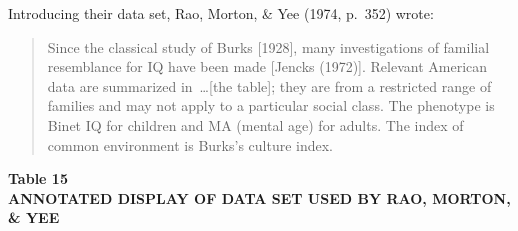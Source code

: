 ﻿\documentclass[12pt]{article}
\begin{document}
Introducing their data set, Rao, Morton, \& Yee (1974, p.\ 352) wrote:

\begin{quote}
Since the classical study of Burks [1928], many investigations of familial resemblance for IQ have been made [Jencks (1972)]. Relevant American data are summarized in~\ldots [the table]; they are from a restricted range of families and may not apply to a particular social class. The phenotype is Binet IQ for children and MA (mental age) for adults. The index of common environment is Burks's culture index.
\end{quote}

\begin{center}
\textbf{Table 15}\\
\textbf{ANNOTATED DISPLAY OF DATA SET USED BY RAO, MORTON, \& YEE}
\end{center}
\end{document}
